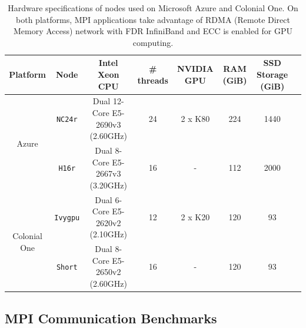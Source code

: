 \documentclass[10pt,journal,compsoc]{IEEEtran}
\begin{document}
\begin{table}[b]
    \renewcommand{\arraystretch}{1.5}
    \caption{Hardware specifications of nodes used on Microsoft Azure and Colonial One. On both platforms, MPI applications take advantage of RDMA (Remote Direct Memory Access) network with FDR InfiniBand and ECC is enabled for GPU computing.}
    \label{tab:hw_specs}
    \centering
    \begin{tabular}{cccccccc}
        Platform & Node & Intel Xeon CPU & \# threads & NVIDIA GPU & RAM (GiB) & SSD Storage (GiB) \\
        \hline
        \multirow{2}{*}{Azure} & \texttt{NC24r} & Dual 12-Core E5-2690v3 (2.60GHz) & 24 & 2 x K80 & 224 & 1440 \\
        & \texttt{H16r} & Dual 8-Core E5-2667v3 (3.20GHz) & 16 & - & 112 & 2000 \\
        \hline
        \multirow{2}{*}{Colonial One} & \texttt{Ivygpu} & Dual 6-Core E5-2620v2 (2.10GHz) & 12 & 2 x K20 & 120 & 93 \\
        & \texttt{Short} & Dual 8-Core E5-2650v2 (2.60GHz) & 16 & - & 120 & 93 \\
        \hline
    \end{tabular}
\end{table}

\subsection{MPI Communication Benchmarks}\label{subsec:mpi_benchmarks}
\end{document}
